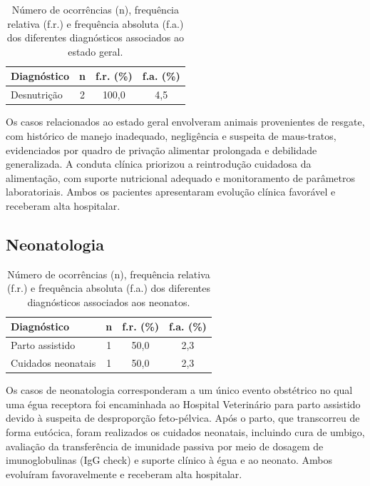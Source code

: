 \begin{table}[htb]
  \centering
  \caption{Número de ocorrências (n), frequência relativa (f.r.) e frequência absoluta (f.a.) dos diferentes diagnósticos associados ao estado geral.}
  \label{tab:estado-geral}
  \begin{tabular}{lccc}
    \toprule
    \textbf{Diagnóstico} & \textbf{n} & \textbf{f.r. (\%)} & \textbf{f.a. (\%)} \\
    \midrule
    Desnutrição & 2 & 100,0 & 4,5 \\
    \bottomrule
  \end{tabular}
\end{table}

Os casos relacionados ao estado geral envolveram animais provenientes de
resgate, com histórico de manejo inadequado, negligência e suspeita de
maus-tratos, evidenciados por quadro de privação alimentar prolongada e
debilidade generalizada. A conduta clínica priorizou a reintrodução
cuidadosa da alimentação, com suporte nutricional adequado e
monitoramento de parâmetros laboratoriais. Ambos os pacientes
apresentaram evolução clínica favorável e receberam alta hospitalar.

\subsection{Neonatologia}
\label{subsec:neonatologia}

\begin{table}[htb]
  \centering
  \caption{Número de ocorrências (n), frequência relativa (f.r.) e frequência absoluta (f.a.) dos diferentes diagnósticos associados aos neonatos.}
  \label{tab:neonatologia}
  \begin{tabular}{lccc}
    \toprule
    \textbf{Diagnóstico} & \textbf{n} & \textbf{f.r. (\%)} & \textbf{f.a. (\%)} \\
    \midrule
    Parto assistido  & 1 & 50,0 & 2,3 \\
    Cuidados neonatais & 1 & 50,0 & 2,3 \\
    \bottomrule
  \end{tabular}
\end{table}

Os casos de neonatologia corresponderam a um único evento obstétrico no
qual uma égua receptora foi encaminhada ao Hospital Veterinário para
parto assistido devido à suspeita de desproporção feto-pélvica. Após o
parto, que transcorreu de forma eutócica, foram realizados os cuidados
neonatais, incluindo cura de umbigo, avaliação da transferência de
imunidade passiva por meio de dosagem de imunoglobulinas (IgG check) e
suporte clínico à égua e ao neonato. Ambos evoluíram favoravelmente e
receberam alta hospitalar.

